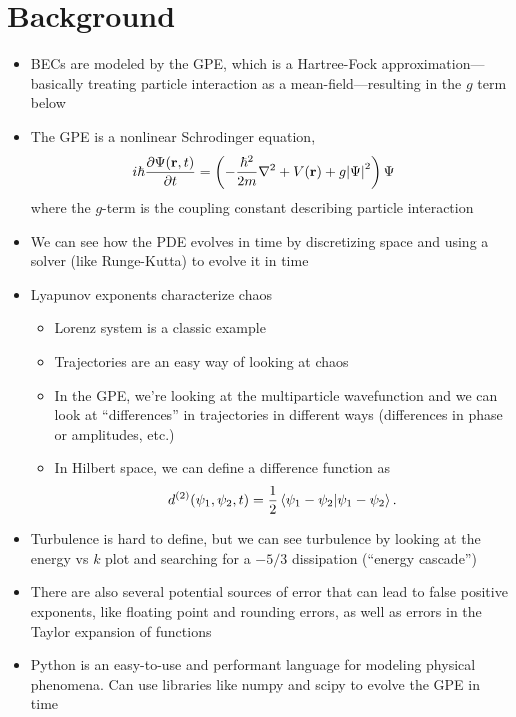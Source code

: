 \documentclass{homework}
\begin{document}
	\section{Background} 
	\begin{itemize}
		\item BECs are modeled by the GPE, which is a Hartree-Fock approximation---basically treating particle interaction as a mean-field---resulting in the $g$ term below
		
		\item The GPE is a nonlinear Schrodinger equation, \begin{align*}
			i \hbar \pdv{\Psi(\bvec{r}, t)}{t} & = \left(
				-\frac{\hbar^2}{2m} \laplacian + V(\bvec{r}) + g\abs{\Psi}^2
			\right) \Psi
		\end{align*}
		where the $g$-term is the coupling constant describing particle interaction
		
		\item We can see how the PDE evolves in time by discretizing space and using a solver (like Runge-Kutta) to evolve it in time
		
		\item Lyapunov exponents characterize chaos \begin{itemize}
			\item Lorenz system is a classic example
			\item Trajectories are an easy way of looking at chaos
			\item In the GPE, we're looking at the multiparticle wavefunction and we can look at ``differences'' in trajectories in different ways (differences in phase or amplitudes, etc.)
			\item In Hilbert space, we can define a difference function as $$d^{(2)}(\psi_1, \psi_2, t) = \frac{1}{2} \braket{\psi_1 - \psi_2}{\psi_1 - \psi_2}.$$
		\end{itemize}
		
		\item Turbulence is hard to define, but we can see turbulence by looking at the energy vs $k$ plot and searching for a $-5/3$ dissipation (``energy cascade'')
		\item There are also several potential sources of error that can lead to false positive exponents, like floating point and rounding errors, as well as errors in the Taylor expansion of functions
		
		\item Python is an easy-to-use and performant language for modeling physical phenomena. Can use libraries like numpy and scipy to evolve the GPE in time
	\end{itemize}
\end{document}
